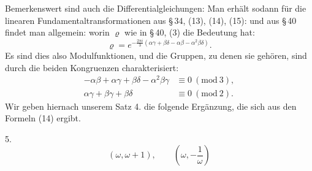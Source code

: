 Bemerkenswert sind auch die Differentialgleichungen:
Man erhält sodann für die linearen Fundamentaltransformationen aus \S\,34, (13), (14), (15):
und aus \S\,40 findet man allgemein:
worin $\varrho$ wie in \S\,40, (3) die Bedeutung hat:
\[
\varrho = e^{-\frac{2\pi i}{3}(\alpha\gamma+\beta\delta-\alpha\beta-\alpha^2\beta\delta)}.
\]
Es sind dies also Modulfunktionen, und die Gruppen, zu denen sie gehören, sind durch die beiden Kongruenzen charakterisiert:
\[
\begin{array}{ll}
-\alpha\beta+\alpha\gamma+\beta\delta-\alpha^2\beta\gamma &\equiv 0\ (\mathrm{mod}\ 3),\\
\alpha\gamma+\beta\gamma+\beta\delta &\equiv 0\ (\mathrm{mod}\ 2).
\end{array}
\]
Wir geben hiernach unserem Satz 4. die folgende Ergänzung, die sich aus den Formeln (14) ergibt.

5. 
\[
(\omega, \omega+1), \qquad \left(\omega, -\dfrac{1}{\omega}\right)
\]
